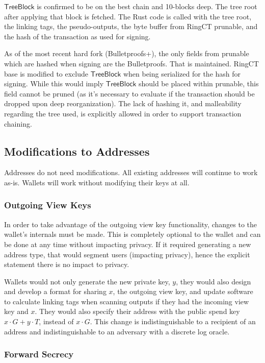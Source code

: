 \documentclass[]{article}
\begin{document}
$\mathsf{TreeBlock}$ is confirmed to be on the best chain and 10-blocks deep. The tree root after applying that block is fetched. The Rust code is called with the tree root, the linking tags, the pseudo-outputs, the byte buffer from RingCT prunable, and the hash of the transaction as used for signing.

As of the most recent hard fork (Bulletproofs+), the only fields from prunable which are hashed when signing are the Bulletproofs. That is maintained. RingCT base is modified to exclude $\mathsf{TreeBlock}$ when being serialized for the hash for signing. While this would imply $\mathsf{TreeBlock}$ should be placed within prunable, this field cannot be pruned (as it's necessary to evaluate if the transaction should be dropped upon deep reorganization). The lack of hashing it, and malleability regarding the tree used, is explicitly allowed in order to support transaction chaining.

\subsection{Modifications to Addresses}

Addresses do not need modifications. All existing addresses will continue to work as-is. Wallets will work without modifying their keys at all.

\subsubsection{Outgoing View Keys}

In order to take advantage of the outgoing view key functionality, changes to the wallet's internals must be made. This is completely optional to the wallet and can be done at any time without impacting privacy. If it required generating a new address type, that would segment users (impacting privacy), hence the explicit statement there is no impact to privacy.

Wallets would not only generate the new private key, $y$, they would also design and develop a format for sharing $x$, the outgoing view key, and update software to calculate linking tags when scanning outputs if they had the incoming view key and $x$. They would also specify their address with the public spend key $x \cdot G + y \cdot T$, instead of $x \cdot G$. This change is indistinguishable to a recipient of an address and indistinguishable to an adversary with a discrete log oracle.

\subsubsection{Forward Secrecy}
\end{document}
